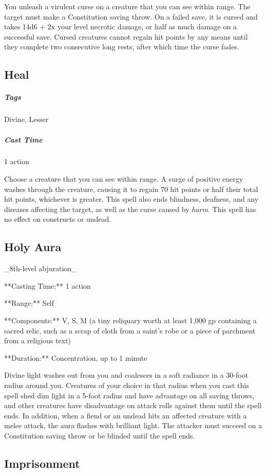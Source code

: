 You unleash a virulent curse on a creature that you can see within range. The target must make a Constitution saving throw. On a failed save, it is cursed and takes 14d6 + 2x your level necrotic damage, or half as much damage on a successful save. Cursed creatures cannot regain hit points by any means until they complete two consecutive long rests, after which time the curse fades.

\subsection{Heal}
\subparagraph*{Tags} Divine, Lesser
\subparagraph*{Cast Time} 1 action

Choose a creature that you can see within range. A surge of positive energy washes through the creature, causing it to regain 70 hit points or half their total hit points, whichever is greater. This spell also ends blindness, deafness, and any diseases affecting the target, as well as the curse caused by \textit{harm}. This spell has no effect on constructs or undead.

\subsection{Holy Aura}

_8th-level abjuration_

**Casting Time:** 1 action

**Range:** Self

**Components:** V, S, M (a tiny reliquary worth at least 1,000 gp containing a sacred relic, such as a scrap of cloth from a saint’s robe or a piece of parchment from a religious text)

**Duration:** Concentration, up to 1 minute

Divine light washes out from you and coalesces in a soft radiance in a 30-foot radius around you. Creatures of your choice in that radius when you cast this spell shed dim light in a 5-foot radius and have advantage on all saving throws, and other creatures have disadvantage on attack rolls against them until the spell ends. In addition, when a fiend or an undead hits an affected creature with a melee attack, the aura flashes with brilliant light. The attacker must succeed on a Constitution saving throw or be blinded until the spell ends.

\subsection{Imprisonment}

